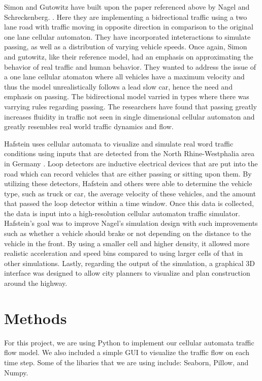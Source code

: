 \documentclass[sigplan,screen]{acmart}
\begin{document}

Simon and Gutowitz have built upon the paper referenced above by Nagel and
Schreckenberg. \cite{simon_cellular_1998-1}. Here they are implementing a
bidrectional traffic using a two lane road with traffic moving in opposite
direction in comparison to the original one lane cellular automaton. They have
incorporated inteteractions to simulate passing, as well as a distribution of
varying vehicle speeds. Once again, Simon and gutowitz, like their reference
model, had an emphasis on approximating the behavior of real traffic and human
behavior. They wanted to address the issue of a one lane cellular atomaton where
all vehicles have a maximum velocity and thus the model unrealistically follows
a lead slow car, hence the need and emphasis on passing. The bidirectional model
varried in types where there was varrying rules regarding passing. The
researchers have found that passing greatly increases fluidity in traffic not
seen in single dimensional cellular automaton and greatly resembles real world
traffic dynamics and flow.

Hafstein uses cellular automata to visualize and simulate real word traffic
conditions using inputs that are detected from the North Rhine-Westphalia area
in Germany \cite{hafstein_high-resolution_2004}. Loop detectors are inductive
electrical devices that are put into the road which can record vehicles that are
either passing or sitting upon them. By utilizing these detectors, Hafstein and
others were able to determine the vehicle type, such as truck or car, the
average velocity of these vehicles, and the amount that passed the loop detector
within a time window. Once this data is collected, the data is input into a
high-resolution cellular automaton traffic simulator. Hafstein’s goal was to
improve Nagel’s simulation design with such improvements such as whether a
vehicle should brake or not depending on the distance to the vehicle in the
front. By using a smaller cell and higher density, it allowed more realistic
acceleration and speed bins compared to using larger cells of that in other
simulations. Lastly, regarding the output of the simulation, a graphical 3D
interface was designed to allow city planners to visualize and plan construction
around the highway.

\section{Methods}
For this project, we are using Python to implement our cellular automata traffic
flow model. We also included a simple GUI to visualize the traffic flow on each
time step. Some of the libaries that we are using include: Seaborn, Pillow, and
Numpy.
\end{document}
